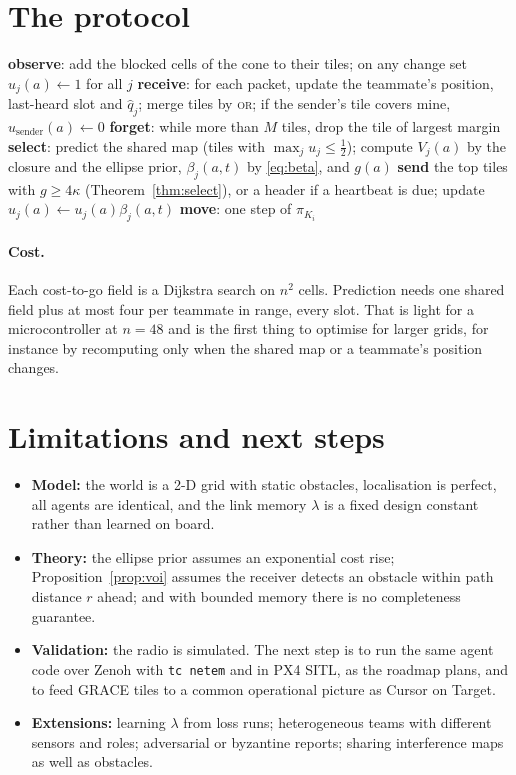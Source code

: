 \documentclass[11pt,a4paper]{article}
\theoremstyle{definition}
\begin{document}
\section{The protocol}

\begin{algorithm}[h]
\caption{GRACE, one slot of agent $i$ (all quantities are functions of $\mathcal I_i(t)$)}\label{alg:grace}
\begin{algorithmic}[1]
\State \textbf{observe}: add the blocked cells of the cone to their tiles; on any change set $u_j(a)\gets1$ for all $j$
\State \textbf{receive}: for each packet, update the teammate's position, last-heard slot and $\hat q_j$; merge tiles by \textsc{or}; if the sender's tile covers mine, $u_{\text{sender}}(a)\gets0$
\State \textbf{forget}: while more than $M$ tiles, drop the tile of largest margin
\State \textbf{select}: predict the shared map (tiles with $\max_ju_j\le\tfrac12$); compute $V_j(a)$ by the closure and the ellipse prior, $\beta_j(a,t)$ by \eqref{eq:beta}, and $g(a)$
\State \textbf{send} the top tiles with $g\ge4\kappa$ (Theorem~\ref{thm:select}), or a header if a heartbeat is due; update $u_j(a)\gets u_j(a)\beta_j(a,t)$
\State \textbf{move}: one step of $\pi_{K_i}$
\end{algorithmic}
\end{algorithm}

\paragraph{Cost.} Each cost-to-go field is a Dijkstra search on $n^2$ cells. Prediction needs one shared field plus at most four per teammate in range, every slot. That is light for a microcontroller at $n=48$ and is the first thing to optimise for larger grids, for instance by recomputing only when the shared map or a teammate's position changes.



\section{Limitations and next steps}
\begin{itemize}
\item \textbf{Model:} the world is a 2-D grid with static obstacles, localisation is perfect, all agents are identical, and the link memory $\lambda$ is a fixed design constant rather than learned on board.
\item \textbf{Theory:} the ellipse prior assumes an exponential cost rise; Proposition~\ref{prop:voi} assumes the receiver detects an obstacle within path distance $r$ ahead; and with bounded memory there is no completeness guarantee.
\item \textbf{Validation:} the radio is simulated. The next step is to run the same agent code over Zenoh with \texttt{tc netem} and in PX4 SITL, as the roadmap plans, and to feed GRACE tiles to a common operational picture as Cursor on Target.
\item \textbf{Extensions:} learning $\lambda$ from loss runs; heterogeneous teams with different sensors and roles; adversarial or byzantine reports; sharing interference maps as well as obstacles.
\end{itemize}
\end{document}

